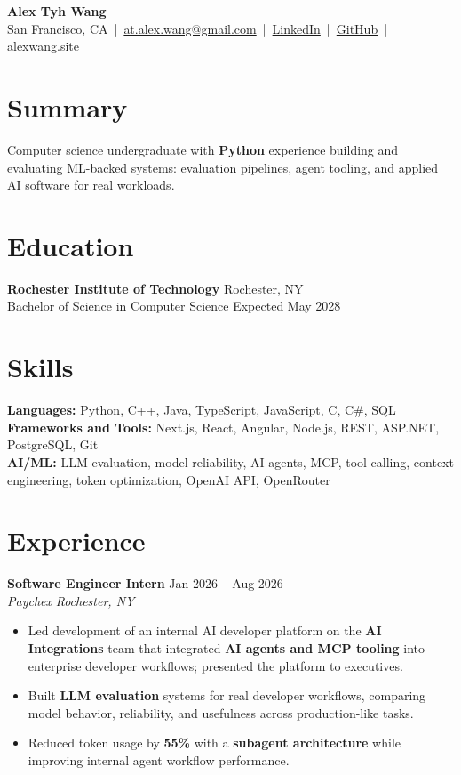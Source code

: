 \documentclass[10pt,letterpaper]{article}
\newif\ifresumeFirstRole
\newcommand{\resumeRole}[4]{%
  \ifresumeFirstRole
    \global\resumeFirstRolefalse
  \else
    \vspace{0pt plus 1fill}%
  \fi
  \textbf{#1} \hfill #2\\
  \textit{#3} \hfill \textit{#4}
}
\begin{document}
\begin{center}
{\Large \textbf{Alex Tyh Wang}}\\
San Francisco, CA \,|\, \href{mailto:at.alex.wang@gmail.com}{at.alex.wang@gmail.com} \,|\, \href{https://www.linkedin.com/in/alex-tyh-wang/}{LinkedIn} \,|\, \href{https://github.com/alextyhwang}{GitHub} \,|\, \href{https://alexwang.site}{alexwang.site}
\end{center}

\section*{Summary}
Computer science undergraduate with \textbf{Python} experience building and evaluating ML-backed systems: evaluation pipelines, agent tooling, and applied AI software for real workloads.

\section*{Education}
\textbf{Rochester Institute of Technology} \hfill Rochester, NY\\
Bachelor of Science in Computer Science \hfill Expected May 2028

\section*{Skills}
\textbf{Languages:} Python, C++, Java, TypeScript, JavaScript, C, C\#, SQL\\
\textbf{Frameworks and Tools:} Next.js, React, Angular, Node.js, REST, ASP.NET, PostgreSQL, Git\\
\textbf{AI/ML:} LLM evaluation, model reliability, AI agents, MCP, tool calling, context engineering, token optimization, OpenAI API, OpenRouter

\section*{Experience}
\resumeRole{Software Engineer Intern}{Jan 2026 -- Aug 2026}{Paychex}{Rochester, NY}
\begin{itemize}
  \item Led development of an internal AI developer platform on the \textbf{AI Integrations} team that integrated \textbf{AI agents and MCP tooling} into enterprise developer workflows; presented the platform to executives.
  \item Built \textbf{LLM evaluation} systems for real developer workflows, comparing model behavior, reliability, and usefulness across production-like tasks.
  \item Reduced token usage by \textbf{55\%} with a \textbf{subagent architecture} while improving internal agent workflow performance.
\end{itemize}
\end{document}
